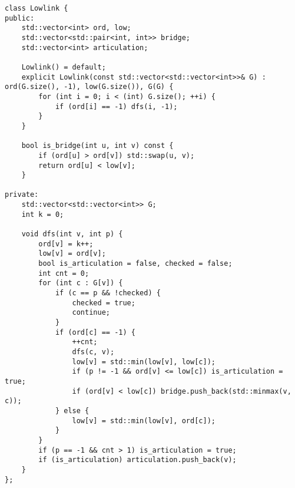 \begin{lstlisting}
class Lowlink {
public:
    std::vector<int> ord, low;
    std::vector<std::pair<int, int>> bridge;
    std::vector<int> articulation;

    Lowlink() = default;
    explicit Lowlink(const std::vector<std::vector<int>>& G) : ord(G.size(), -1), low(G.size()), G(G) {
        for (int i = 0; i < (int) G.size(); ++i) {
            if (ord[i] == -1) dfs(i, -1);
        }
    }

    bool is_bridge(int u, int v) const {
        if (ord[u] > ord[v]) std::swap(u, v);
        return ord[u] < low[v];
    }

private:
    std::vector<std::vector<int>> G;
    int k = 0;

    void dfs(int v, int p) {
        ord[v] = k++;
        low[v] = ord[v];
        bool is_articulation = false, checked = false;
        int cnt = 0;
        for (int c : G[v]) {
            if (c == p && !checked) {
                checked = true;
                continue;
            }
            if (ord[c] == -1) {
                ++cnt;
                dfs(c, v);
                low[v] = std::min(low[v], low[c]);
                if (p != -1 && ord[v] <= low[c]) is_articulation = true;
                if (ord[v] < low[c]) bridge.push_back(std::minmax(v, c));
            } else {
                low[v] = std::min(low[v], ord[c]);
            }
        }
        if (p == -1 && cnt > 1) is_articulation = true;
        if (is_articulation) articulation.push_back(v);
    }
};
\end{lstlisting}
